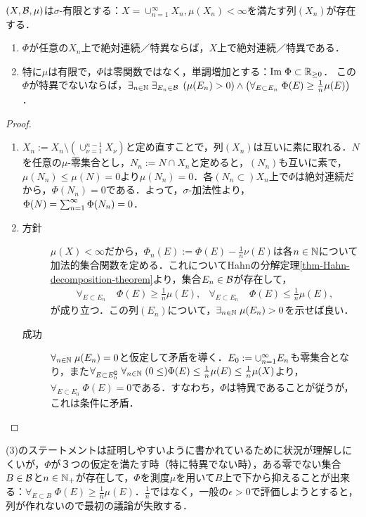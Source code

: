\documentclass[uplatex, dvipdfmx]{jsreport}
\begin{document}
\begin{lemma}\label{lemma-sigma-finite}
    $(X,\mathcal{B},\mu)$は$\sigma$-有限とする：$X=\cup^\infty_{n=1}X_n,\mu(X_n)<\infty$を満たす列$(X_n)$が存在する．
    \begin{enumerate}
        \item $\Phi$が任意の$X_n$上で絶対連続／特異ならば，$X$上で絶対連続／特異である．
        \item 特に$\mu$は有限で，$\Phi$は零関数ではなく，単調増加とする：$\mathrm{Im}\;\Phi\subset\mathbb{R}_{\ge 0}$．
        この$\Phi$が特異でないならば，$\exists_{n\in\mathbb{N}}\;\exists_{E_n\in\mathcal{B}}\;\left(\mu(E_n)>0\right)\land\left(\forall_{E\subset E_n}\;\Phi(E)\ge\frac{1}{n}\mu(E)\right)$．
    \end{enumerate}
\end{lemma}
\begin{proof}\mbox{}
    \begin{enumerate}
        \item $X_n:=X_n\setminus(\cup_{\nu=1}^{n-1}X_\nu)$と定め直すことで，列$(X_n)$は互いに素に取れる．$N$を任意の$\mu$-零集合とし，$N_n:=N\cap X_n$と定めると，$(N_n)$も互いに素で，$\mu(N_n)\le\mu(N)=0$より$\mu(N_n)=0$．各$(N_n\subset )X_n$上で$\Phi$は絶対連続だから，$\Phi(N_n)=0$である．よって，$\sigma$-加法性より，$\Phi(N)=\sum_{n=1}^\infty\Phi(N_n)=0$．
        \item \begin{description}
            \item[方針] 
        $\mu(X)<\infty$だから，$\Phi_n(E):=\Phi(E)-\frac{1}{n}\nu(E)$は各$n\in\mathbb{N}$について加法的集合関数を定める．これについてHahnの分解定理\ref{thm-Hahn-decomposition-theorem}より，集合$E_n\in\mathcal{B}$が存在して，
        \begin{align*}
            \forall_{E\subset E_n}\;&\Phi(E)\ge\frac{1}{n}\mu(E),&\forall_{E\subset E_n^\comp}\;&\Phi(E)\le\frac{1}{n}\mu(E),
        \end{align*}
        が成り立つ．この列$(E_n)$について，$\exists_{n\in\mathbb{N}}\;\mu(E_n)>0$を示せば良い．
            \item[成功]
        $\forall_{n\in\mathbb{N}}\;\mu(E_n)=0$と仮定して矛盾を導く．$E_0:=\cup_{n=1}^\infty E_n$も零集合となり，また$\forall_{E\subset E_0^\complement}\;\forall_{n\in\mathbb{N}}\;(0\le)\Phi(E)\le\frac{1}{n}\mu(E)\le\frac{1}{n}\mu(X)$より，$\forall_{E\subset E_0^\comp}\;\Phi(E)=0$である．すなわち，$\Phi$は特異であることが従うが，これは条件に矛盾．
        \end{description}
    \end{enumerate}
\end{proof}
\begin{remarks}
    (3)のステートメントは証明しやすいように書かれているために状況が理解しにくいが，$\Phi$が３つの仮定を満たす時（特に特異でない時），ある零でない集合$B\in\mathcal{B}$と$n\in\mathbb{N}_+$が存在して，$\Phi$を測度$\mu$を用いて$B$上で下から抑えることが出来る：$\forall_{E\subset B}\;\Phi(E)\ge\frac{1}{n}\mu(E)$．$\frac{1}{n}$ではなく，一般の$\epsilon>0$で評価しようとすると，列が作れないので最初の議論が失敗する．
\end{remarks}
\end{document}

